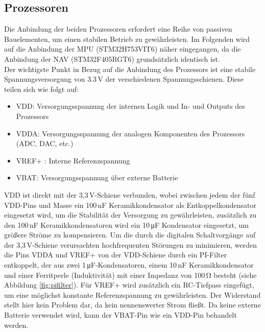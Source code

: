\subsection{Prozessoren}
\label{subsec:prozessoren}
Die Anbindung der beiden Prozessoren erfordert eine Reihe von passiven Bauelementen, um einen stabilen Betrieb zu gewährleisten. Im Folgenden wird auf die Anbindung der MPU (STM32H753VIT6) näher eingegangen, da die Anbindung der NAV (STM32F405RGT6) grundsätzlich identisch ist. \cite{STM32F405xI} \cite{STM32H753xI} 
\\
Der wichtigste Punkt in Bezug auf die Anbindung des Prozessors ist eine stabile Spannungsversorgung von 3.3\,V der verschiedenen Spannungsschienen. Diese teilen sich wie folgt auf: 
\begin{itemize}
    \item VDD: Versorgungsspannung der internen Logik und In- und Outputs des Prozessors
    \item VDDA: Versorgungsspannung der analogen Komponenten des Prozessors (ADC, DAC, etc.)
    \item VREF+ : Interne Referenzspannung
    \item VBAT: Versorgungsspannung über externe Batterie
\end{itemize}
VDD ist direkt mit der 3,3\,V-Schiene verbunden, wobei zwischen jedem der fünf VDD-Pins und Masse ein 100\,nF Keramikkondensator als Entkoppelkondensator eingesetzt wird, um die Stabilität der Versorgung zu gewährleisten, zusätzlich zu den 100\,nF Keramikkondensatoren wird ein 10\,\si{\micro\farad} Kondensator eingesetzt, um größere Ströme zu kompensieren. 
Um die durch die digitalen Schaltvorgänge auf der 3,3\,V-Schiene verursachten hochfrequenten Störungen zu minimieren, werden die Pins VDDA und VREF+ von der VDD-Schiene durch ein PI-Filter entkoppelt, der aus zwei 1\,\si{\micro\farad}-Kondensatoren, einem 10\,nF Keramikkondensator und einer Ferritperle (Induktivität) mit einer Impedanz von 100\,\si{\ohm} besteht (siehe Abbildung \ref{fig:pifilter}). Für VREF+ wird zusätzlich ein RC-Tiefpass eingefügt, um eine möglichst konstante Referenzspannung zu gewährleisten. Der Widerstand stellt hier kein Problem dar, da kein nennenswerter Strom fließt. Da keine externe Batterie verwendet wird, kann der VBAT-Pin wie ein VDD-Pin behandelt werden.

